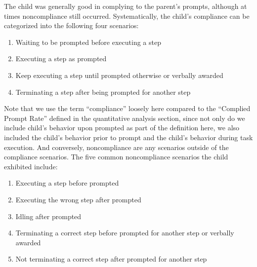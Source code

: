 \documentclass{ut-thesis}
\begin{document}
The child was generally good in complying to the parent's prompts, although at times noncompliance still occurred.  Systematically, the child's compliance can be categorized into the following four scenarios:
\begin{enumerate}
	\item Waiting to be prompted before executing a step
	\item Executing a step as prompted
	\item Keep executing a step until prompted otherwise or verbally awarded
	\item Terminating a step after being prompted for another step
\end{enumerate}
Note that we use the term ``compliance'' loosely here compared to the ``Complied Prompt Rate'' defined in the quantitative analysis section, since not only do we include child's behavior upon prompted as part of the definition here, we also included the child's behavior prior to prompt and the child's behavior during task execution.  And conversely, noncompliance are any scenarios outside of the compliance scenarios.  The five common noncompliance scenarios the child exhibited include:
\label{List:NoncopmlianceBehaviors}
\begin{enumerate}
	\item Executing a step before prompted
	\item Executing the wrong step after prompted
	\item Idling after prompted
	\item Terminating a correct step before prompted for another step or verbally awarded
	\item Not terminating a correct step after prompted for another step
\end{enumerate}
\end{document}
